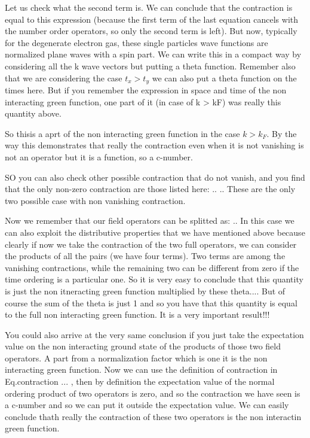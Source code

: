 \documentclass[../main/main.tex]{subfiles}
\begin{document}
Let us check what the second term is. We can conclude that the contraction is equal to this expression (because the first term of the last equation cancels with the number order operators, so only the second term is left).
But now, typically for the degenerate electron gas, these single particles wave functions are normalized plane waves with a spin part. We can write this in a compact way by considering all the k wave vectors but putting a theta function. Remember also that we are considering the case \( t_x>t_y \) we can also put a theta function on the times here.
But if you remember the expression in space and time of the non interacting green function,  one part of it (in case of k > kF) was really this quantity above.

So thisis a aprt of the non interacting green function in the case \( k>k_F \). By the way this demonstrates that really the contraction even when it is not vanishing is not an operator but it is a function, so a c-number.

SO you can also check other possible contraction that do not vanish, and you find that the only non-zero contraction are those listed here:
..
..
These are the only two possible case with non vanishing contraction.


Now we remember that our field operators can be splitted as:
..
In this case we can also exploit the distributive properties that we have mentioned above because clearly if now we take the contraction of the two full operators, we can consider the products of all the pairs (we have four terms). Two terms are among the vanishing contractions, while the remaining two can be different from zero if the time ordering is a particular one.
So it is very easy to conclude that this quantity is just the non itneracting green function multiplied by these theta....
But of course the sum of the theta is just 1 and so you have that this quantity is equal to the full non interacting green function. It is a very important result!!!


You could also arrive at the very same conclusion if you just take the expectation value on the non interacting ground state of the products of those two field operators. A part from a normalization factor which is one it is the non interacting green function. Now we can use the definition of contraction in Eq.contraction ...
, then by definition the expectation value of the normal ordering product of two operators is zero, and so the contraction we have seen is a c-number and so we can put it outside the expectation value. We can easily conclude thath really the contraction of these two operators is the non interactin green function.
\end{document}
